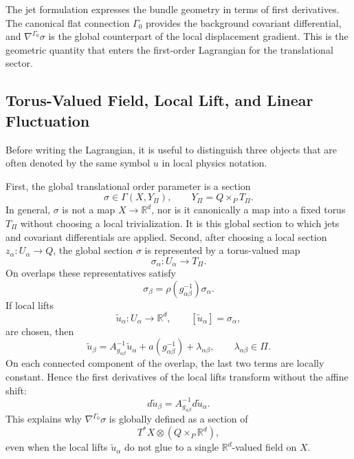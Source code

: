 \documentclass[11pt]{amsart}
\theoremstyle{plain}
\theoremstyle{definition}
\theoremstyle{remark}
\begin{document}
The jet formulation expresses the bundle geometry in terms of first derivatives. 
The canonical flat connection \(\Gamma_0\) provides the background covariant differential, and \(\nabla^{\Gamma_0}\sigma\) is the global counterpart of the local displacement gradient. 
This is the geometric quantity that enters the first-order Lagrangian for the translational sector.

\subsection{Torus-Valued Field, Local Lift, and Linear Fluctuation}
\label{subsec:toric_lift_linearization}

Before writing the Lagrangian, it is useful to distinguish three objects that are often denoted by the same symbol \(u\) in local physics notation.

First, the global translational order parameter is a section
\[
\sigma\in \Gamma(X,Y_\Pi),
\qquad
Y_\Pi=Q\times_P T_\Pi.
\]
In general, \(\sigma\) is not a map \(X\to\mathbb R^d\), nor is it canonically a map into a fixed torus \(T_\Pi\) without choosing a local trivialization. 
It is this global section to which jets and covariant differentials are applied.
Second, after choosing a local section \(z_\alpha:U_\alpha\to Q\), the global section \(\sigma\) is represented by a torus-valued map
\[
\sigma_\alpha:U_\alpha\to T_\Pi.
\]
On overlaps these representatives satisfy
\[
\sigma_\beta
=
\rho(g_{\alpha\beta}^{-1})\sigma_\alpha.
\]
If local lifts
\[
\widetilde u_\alpha:U_\alpha\to\mathbb R^d,
\qquad
[\widetilde u_\alpha]=\sigma_\alpha,
\]
are chosen, then
\[
\widetilde u_\beta
=
A_{g_{\alpha\beta}}^{-1}\widetilde u_\alpha
+
a(g_{\alpha\beta}^{-1})
+
\lambda_{\alpha\beta},
\qquad
\lambda_{\alpha\beta}\in\Pi.
\]
On each connected component of the overlap, the last two terms are locally constant. Hence the first derivatives of the local lifts transform without the affine shift:
\begin{equation}
	d\widetilde u_\beta
	=
	A_{g_{\alpha\beta}}^{-1}d\widetilde u_\alpha.
	\label{eq:local_lift_derivative_transform}
\end{equation}
This explains why \(\nabla^{\Gamma_0}\sigma\) is globally defined as a section of
\[
T^*X\otimes(Q\times_P\mathbb R^d),
\]
even when the local lifts \(\widetilde u_\alpha\) do not glue to a single \(\mathbb R^d\)-valued field on \(X\).
\end{document}
